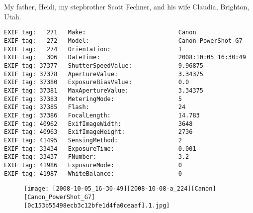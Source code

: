 \section{\protect{}}
\noindent My father, Heidi, my stepbrother Scott Fechner, and his wife Claudia, Brighton, Utah.
\noindent
\begin{lstlisting}
EXIF tag:   271   Make:                          Canon
EXIF tag:   272   Model:                         Canon PowerShot G7
EXIF tag:   274   Orientation:                   1
EXIF tag:   306   DateTime:                      2008:10:05 16:30:49
EXIF tag: 37377   ShutterSpeedValue:             9.96875
EXIF tag: 37378   ApertureValue:                 3.34375
EXIF tag: 37380   ExposureBiasValue:             0.0
EXIF tag: 37381   MaxApertureValue:              3.34375
EXIF tag: 37383   MeteringMode:                  5
EXIF tag: 37385   Flash:                         24
EXIF tag: 37386   FocalLength:                   14.783
EXIF tag: 40962   ExifImageWidth:                3648
EXIF tag: 40963   ExifImageHeight:               2736
EXIF tag: 41495   SensingMethod:                 2
EXIF tag: 33434   ExposureTime:                  0.001
EXIF tag: 33437   FNumber:                       3.2
EXIF tag: 41986   ExposureMode:                  0
EXIF tag: 41987   WhiteBalance:                  0

\end{lstlisting}
\clearpage
\begin{figure}
\raggedleft
\texttt{[image: [2008-10-05\_16-30-49][2008-10-08-a\_224][Canon][Canon\_PowerShot\_G7][0c153b55498ecb3c12bfe1d4fa0ceaaf].1.jpg]}
\end{figure}


\clearpage
